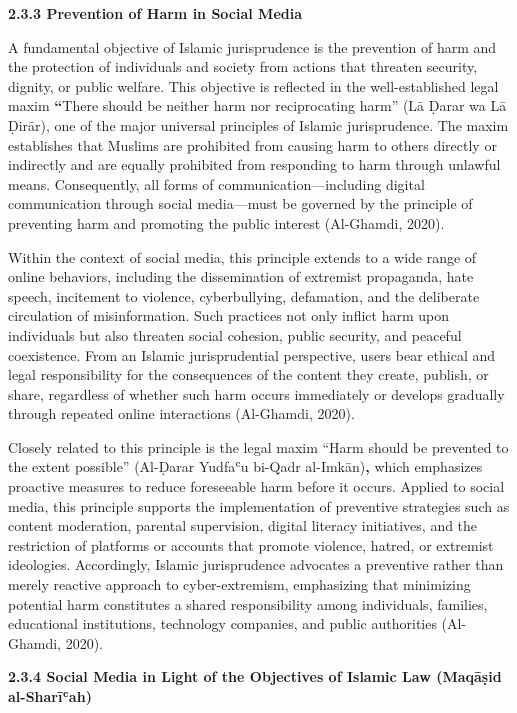 \documentclass[11pt,a4paper]{article}
\begin{document}
	\textbf{2.3.3 Prevention of Harm in Social Media}
	
	A fundamental objective of Islamic jurisprudence is the prevention of harm and the protection of individuals and society from actions that threaten security, dignity, or public welfare. This objective is reflected in the well-established legal maxim \textbf{``}There should be neither harm nor reciprocating harm'' (Lā Ḍarar wa Lā Ḍirār), one of the major universal principles of Islamic jurisprudence. The maxim establishes that Muslims are prohibited from causing harm to others directly or indirectly and are equally prohibited from responding to harm through unlawful means. Consequently, all forms of communication---including digital communication through social media---must be governed by the principle of preventing harm and promoting the public interest (Al-Ghamdi, 2020).
	
	Within the context of social media, this principle extends to a wide range of online behaviors, including the dissemination of extremist propaganda, hate speech, incitement to violence, cyberbullying, defamation, and the deliberate circulation of misinformation. Such practices not only inflict harm upon individuals but also threaten social cohesion, public security, and peaceful coexistence. From an Islamic jurisprudential perspective, users bear ethical and legal responsibility for the consequences of the content they create, publish, or share, regardless of whether such harm occurs immediately or develops gradually through repeated online interactions (Al-Ghamdi, 2020).
	
	Closely related to this principle is the legal maxim ``Harm should be prevented to\textbf{ }the extent possible'' (Al-Ḍarar Yudfaʿu bi-Qadr al-Imkān)\textbf{,} which emphasizes proactive measures to reduce foreseeable harm before it occurs. Applied to social media, this principle supports the implementation of preventive strategies such as content moderation, parental supervision, digital literacy initiatives, and the restriction of platforms or accounts that promote violence, hatred, or extremist ideologies. Accordingly, Islamic jurisprudence advocates a preventive rather than merely reactive approach to cyber-extremism, emphasizing that minimizing potential harm constitutes a shared responsibility among individuals, families, educational institutions, technology companies, and public authorities (Al-Ghamdi, 2020).
	
	\textbf{2.3.4 Social Media in Light of the Objectives of Islamic Law (Maqāṣid al-Sharīʿah)}
	
\end{document}
